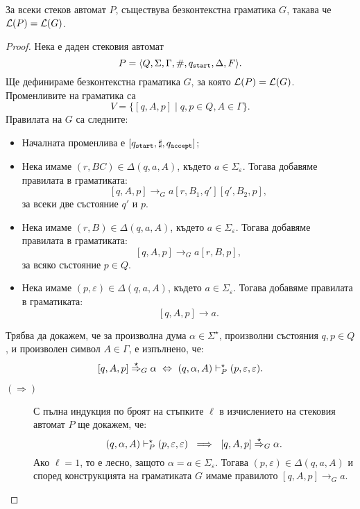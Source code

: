 \begin{framed}
  \begin{lemma}
    За всеки стеков автомат $P$, съществува безконтекстна граматика $G$, такава че $\mathcal{L}(P) = \mathcal{L}(G)$.
  \end{lemma}
\end{framed}
\begin{proof}
  Нека е даден стековия автомат
  \[P = \langle{Q,\Sigma,\Gamma,\#,q_{\texttt{start}},\Delta,F}\rangle.\]
  Ще дефинираме безконтекстна граматика $G$, за която $\mathcal{L}(P) = \mathcal{L}(G)$.
  Променливите на граматика са 
  \[V = \{[q,A,p] \mid q,p \in Q, A \in \Gamma\}.\]
  Правилата на $G$ са следните:
  \begin{itemize}
  \item
    Началната променлива е $[q_{\texttt{start}},\sharp,q_{\texttt{accept}}]$;
  \item
    Нека имаме $(r,BC) \in \Delta(q, a, A)$, където $a \in \Sigma_\varepsilon$.
    Тогава добавяме правилата в граматиката:
    \[[q,A,p] \to_G a[r,B_1,q'][q',B_2,p],\]
    за всеки две състояние $q'$ и $p$.
  \item
    Нека имаме $(r,B) \in \Delta(q, a, A)$, където $a \in \Sigma_\varepsilon$.
    Тогава добавяме правилата в граматиката:
    \[[q,A,p] \to_G a[r,B,p],\]
    за всяко състояние $p \in Q$.
  \item
    Нека имаме $(p,\varepsilon) \in \Delta(q,a,A)$, където $a \in \Sigma_\varepsilon$.
    Тогава добавяме правилата в граматиката:
    \[[q,A,p] \to a.\]
  \end{itemize}
  Трябва да докажем, че за произволна дума $\alpha \in \Sigma^\star$, произволни състояния $q,p \in Q$,
  и произволен символ $A \in \Gamma$, е изпълнено, че:
  \[[q,A,p] \stackrel{{\star}}{\Rightarrow}_G \alpha\ \Leftrightarrow\ (q,\alpha,A) \vdash^\star_{P} (p,\varepsilon,\varepsilon).\]
  \begin{description}
  \item[$(\Rightarrow)$]
    С пълна индукция по броят на стъпките $\ell$ в изчислението на стековия автомат $P$ ще докажем, че:
    \[(q,\alpha,A) \vdash^\star_P (p,\varepsilon,\varepsilon)\ \implies\ [q,A,p] \stackrel{{\star}}{\Rightarrow}_G \alpha.\]
    Ако $\ell = 1$, то е лесно, защото $\alpha = a \in \Sigma_\varepsilon$.
    Тогава $(p,\varepsilon) \in \Delta(q,a,A)$ и според конструкцията на граматиката $G$ имаме правилото $[q,A,p] \to_G a$.
    

\end{description}
\end{proof}
